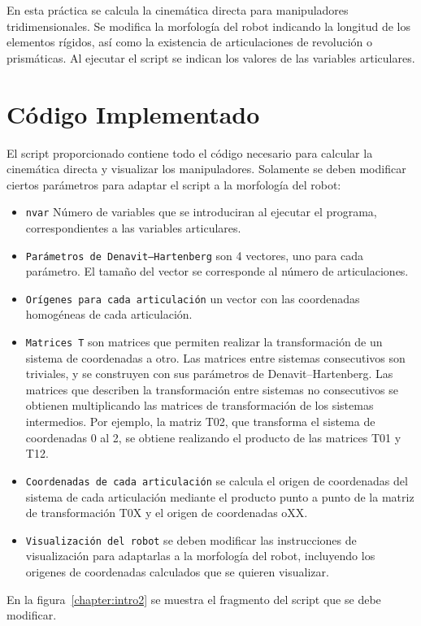 En esta práctica se calcula la cinemática directa para manipuladores tridimensionales. 
Se modifica la morfología del robot indicando la longitud de los elementos rígidos, así como la existencia de articulaciones de revolución o prismáticas.
Al ejecutar el script se indican los valores de las variables articulares.

\section{Código Implementado}
El script proporcionado contiene todo el código necesario para calcular la cinemática directa y visualizar los manipuladores. 
Solamente se deben modificar ciertos parámetros para adaptar el script a la morfología del robot:
\begin{itemize}
   \item \texttt{nvar} Número de variables que se introduciran al ejecutar el programa, correspondientes a las variables articulares.
   \item \texttt{Parámetros de Denavit–Hartenberg} son 4 vectores, uno para cada parámetro. El tamaño del vector se corresponde al número de articulaciones.
   \item \texttt{Orígenes para cada articulación} un vector con las coordenadas homogéneas de cada articulación.
   \item \texttt{Matrices T} son matrices que permiten realizar la transformación de un sistema de coordenadas a otro.
   Las matrices entre sistemas consecutivos son triviales, y se construyen con sus parámetros de Denavit–Hartenberg.
   Las matrices que describen la transformación entre sistemas no consecutivos se obtienen multiplicando las matrices de transformación de los sistemas intermedios.
   Por ejemplo, la matriz T02, que transforma el sistema de coordenadas 0 al 2, se obtiene realizando el producto de las matrices T01 y T12.
   \item \texttt{Coordenadas de cada articulación} se calcula el origen de coordenadas del sistema de cada articulación mediante el producto punto a punto de la matriz de transformación T0X y el origen de coordenadas oXX.
   \item \texttt{Visualización del robot} se deben modificar las instrucciones de visualización para adaptarlas a la morfología del robot, incluyendo los origenes de coordenadas calculados que se quieren visualizar.
\end{itemize}
En la figura~\ref{chapter:intro2} se muestra el fragmento del script que se debe modificar.
